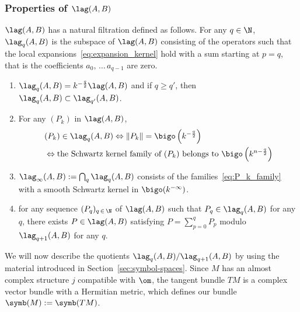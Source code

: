\subsubsection{Properties of $\lag (A,B)$}

$\lag (A, B)$ has a natural filtration defined as follows. For any $q \in
\N$, $\lag _q (A, B)$ is the subspace of $\lag (A,B)$ consisting of the operators such that the local expansions~\eqref{eq:expansion_kernel} hold with a sum starting at $p = q$, that is the coefficients $a_0,\, \ldots\,a_{q-1}$ are zero.

\begin{prop}\label{prop:lag}\leavevmode
\begin{enumerate}
\item\label{prop2.2.1} $\lag _q (A, B) = k^{-\frac{q}{2}}
\lag (A, B)$ and if $q \geqslant q'$, then $\lag_q(A,B) \subset \lag_{q'} (A,B)$.
\item\label{prop2.2.2} For any $(P_k)$ in $\lag (A, B)$,
\begin{align*}
&(P_k) \in \lag_q(A,B) \Leftrightarrow \| P_k \| = \bigo \left(k^{-\frac{q}{2}}\right) \\
&\Leftrightarrow \text{the Schwartz kernel family of $(P_k)$ belongs to }
\bigo \left(k^{n-\frac{q}{2}}\right)
\end{align*}
\item\label{prop2.2.3} $\lag_{\infty} (A,B) := \bigcap_q \lag_q(A,B)$ consists of the families~\eqref{eq:P_k_family} with a smooth Schwartz kernel in $ \bigo (k^{-\infty})$.
\item\label{prop2.2.4} for any sequence $(P_q)_{q\,\in\,\N}$ of $\lag (A,B)$ such that $P_q \in \lag_q(A, B)$ for any $q$, there exists $P \in \lag (A,B)$ satisfying $P = \sum_{p=0}^q P_p$ modulo $\lag_{q+1} (A,B)$ for any $q$.
\end{enumerate}
\end{prop}

We will now describe the quotients $\lag_q (A,B)/ \lag_{q+1} (A,B)$ by using the material introduced in Section~\ref{sec:symbol-spaces}. Since $M$ has an almost complex structure $j$ compatible with $\om$, the tangent bundle $TM$ is a complex vector bundle with a Hermitian metric, which defines our bundle $\symb (M) := \symb (TM)$.

